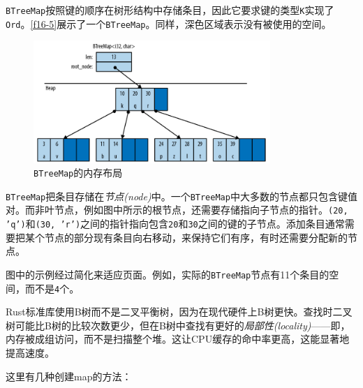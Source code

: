 \texttt{BTreeMap}按照键的顺序在树形结构中存储条目，因此它要求键的类型\texttt{K}实现了\texttt{Ord}。\autoref{f16-5}展示了一个\texttt{BTreeMap}。同样，深色区域表示没有被使用的空间。

\begin{figure}[htbp]
    \centering
    \includegraphics[width=0.8\textwidth]{../img/f16-5.png}
    \caption{\texttt{BTreeMap}的内存布局}
    \label{f16-5}
\end{figure}

\texttt{BTreeMap}把条目存储在\emph{节点(node)}中。一个\texttt{BTreeMap}中大多数的节点都只包含键值对。而非叶节点，例如图中所示的根节点，还需要存储指向子节点的指针。\texttt{(20, 'q')}和\texttt{(30, 'r')}之间的指针指向包含\texttt{20}和\texttt{30}之间的键的子节点。添加条目通常需要把某个节点的部分现有条目向右移动，来保持它们有序，有时还需要分配新的节点。

图中的示例经过简化来适应页面。例如，实际的\texttt{BTreeMap}节点有11个条目的空间，而不是\texttt{4}个。

Rust标准库使用B树而不是二叉平衡树，因为在现代硬件上B树更快。查找时二叉树可能比B树的比较次数更少，但在B树中查找有更好的\emph{局部性(locality)}——即，内存被成组访问，而不是扫描整个堆。这让CPU缓存的命中率更高，这能显著地提高速度。

这里有几种创建map的方法：





